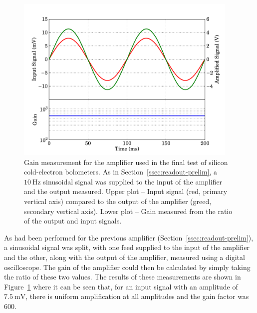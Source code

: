\begin{figure}[t]
\begin{center}
\includegraphics[width = 0.95\textwidth]{figures/final_amp_gain}
\caption[Gain measurement of final amplifier]{Gain measurement for the amplifier used in the final test of silicon cold-electron bolometers. As in Section~\ref{ssec:readout-prelim}, a $10~\mathrm{Hz}$ sinusoidal signal was supplied to the input of the amplifier and the output measured. Upper plot -- Input signal (red, primary vertical axis) compared to the output of the amplifier (greed, secondary vertical axis). Lower plot -- Gain measured from the ratio of the output and input signals.}
\label{fig:finalAmp_gain}
\end{center}
\end{figure}
\par 
As had been performed for the previous amplifier (Section~\ref{ssec:readout-prelim}), a sinusoidal signal was split, with one feed supplied to the input of the amplifier and the other, along with the output of the amplifier, measured using a digital oscilloscope. The gain of the amplifier could then be calculated by simply taking the ratio of these two values. The results of these measurements are shown in Figure~\ref{fig:finalAmp_gain} where it can be seen that, for an input signal with an amplitude of $7.5~\mathrm{mV}$, there is uniform amplification at all amplitudes and the gain factor was 600.
